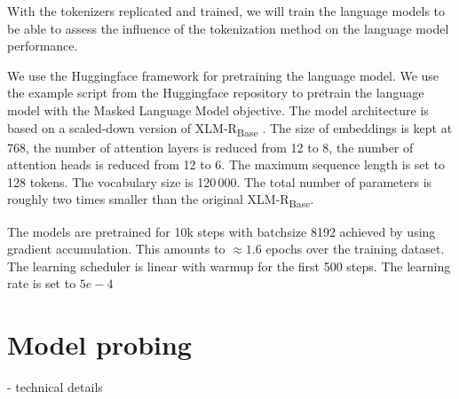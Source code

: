 With the tokenizers replicated and trained, we will train the language models to be able to assess the influence of the tokenization method on the language model performance.

We use the Huggingface framework \cite{wolf_transformers_2020} for pretraining the language model. We use the example script from the Huggingface repository to pretrain the language model with the Masked Language Model objective. The model architecture is based on a scaled-down version of XLM-R\textsubscript{Base} \cite{conneau_unsupervised_2020}. The size of embeddings is kept at 768, the number of attention layers is reduced from 12 to 8, the number of attention heads is reduced from 12 to 6. The maximum sequence length is set to 128 tokens. The vocabulary size is 120\,000. The total number of parameters is roughly two times smaller than the original XLM-R\textsubscript{Base}.

The models are pretrained for 10k steps with batchsize 8192 achieved by using gradient accumulation. This amounts to $\approx 1.6$ epochs over the training dataset. The learning scheduler is linear with warmup for the first 500 steps. The learning rate is set to $5e-4$

\section{Model probing}

- technical details

